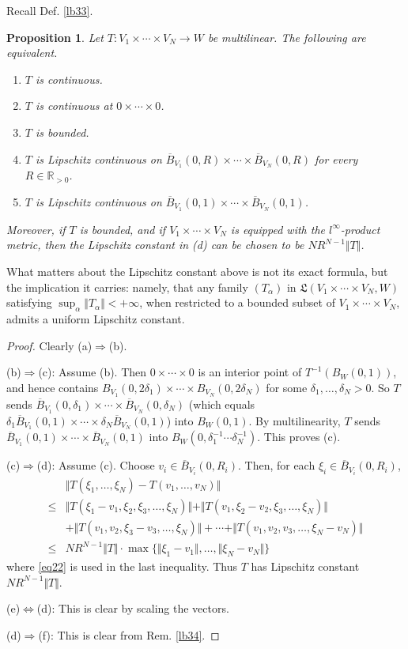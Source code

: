 \documentclass[12pt,b5paper,notitlepage]{article}
\theoremstyle{definition}
\theoremstyle{plain}
\newtheorem{pp}[df]{Proposition}
\newcommand{\fk}{\mathfrak}
\newcommand{\ovl}{\overline}
\newcommand{\Rbb}{\mathbb R}
\numberwithin{equation}{section}
\begin{document}
Recall Def. \ref{lb33}.

\begin{pp}\label{lb35}
Let $T:V_1\times\cdots\times V_N\rightarrow W$ be multilinear. The following are equivalent.
\begin{enumerate}[label=(\alph*)]
\item $T$ is continuous.
\item $T$ is continuous at $0\times\cdots\times 0$.
\item $T$ is bounded.
\item $T$ is Lipschitz continuous on $\ovl B_{V_1}(0,R)\times\cdots\times\ovl B_{V_N}(0,R)$ for every $R\in\Rbb_{>0}$.
\item $T$ is Lipschitz continuous on $\ovl B_{V_1}(0,1)\times\cdots\times\ovl B_{V_N}(0,1)$.
\end{enumerate}
Moreover, if $T$ is bounded, and if $V_1\times\cdots\times V_N$ is equipped with the $l^\infty$-product metric, then the Lipschitz constant in (d) can be chosen to be $NR^{N-1}\Vert T\Vert$.
\end{pp}

What matters about the Lipschitz constant above is not its exact formula, but the implication it carries: namely, that any family $(T_\alpha)$ in $\fk L(V_1\times\cdots\times V_N,W)$ satisfying $\sup_\alpha\Vert T_\alpha\Vert<+\infty$, when restricted to a bounded subset of $V_1\times\cdots\times V_N$, admits a uniform Lipschitz constant.


\begin{proof}
Clearly (a)$\Rightarrow$(b).

(b)$\Rightarrow$(c): Assume (b). Then $0\times\cdots\times 0$ is an interior point of $T^{-1}(B_W(0,1))$, and hence contains $B_{V_1}(0,2\delta_1)\times\cdots\times B_{V_N}(0,2\delta_N)$ for some $\delta_1,\dots,\delta_N>0$. So $T$ sends $\ovl B_{V_1}(0,\delta_1)\times\cdots\times\ovl B_{V_N}(0,\delta_N)$ (which equals $\delta_1\ovl B_{V_1}(0,1)\times\cdots\times\delta_N\ovl B_{V_N}(0,1)$) into $B_W(0,1)$. By multilinearity, $T$ sends $\ovl B_{V_1}(0,1)\times\cdots\times\ovl B_{V_N}(0,1)$ into $B_W(0,\delta_1^{-1}\cdots\delta_N^{-1})$. This proves (c). 

(c)$\Rightarrow$(d): Assume (c). Choose $v_i\in \ovl B_{V_i}(0,R_i)$. Then, for each $\xi_i\in \ovl B_{V_i}(0,R_i)$,
\begin{align*}
&\Vert T(\xi_1,\dots,\xi_N)-T(v_1,\dots,v_N)\Vert\\
\leq&\Vert T(\xi_1-v_1,\xi_2,\xi_3,\dots,\xi_N)\Vert+\Vert T(v_1,\xi_2-v_2,\xi_3,\dots,\xi_N)\Vert\\
&+\Vert T(v_1,v_2,\xi_3-v_3,\dots,\xi_N)\Vert+\cdots+\Vert T(v_1,v_2,v_3,\dots,\xi_N-v_N)\Vert\\
\leq&NR^{N-1}\Vert T\Vert\cdot \max\{\Vert \xi_1-v_1\Vert,\dots,\Vert \xi_N-v_N\Vert\}
\end{align*}
where \eqref{eq22} is used in the last inequality. Thus $T$ has Lipschitz constant $NR^{N-1}\Vert T\Vert$.

(e)$\Leftrightarrow$(d): This is clear by scaling the vectors.

(d)$\Rightarrow$(f): This is clear from Rem. \ref{lb34}.
\end{proof}
\end{document}
